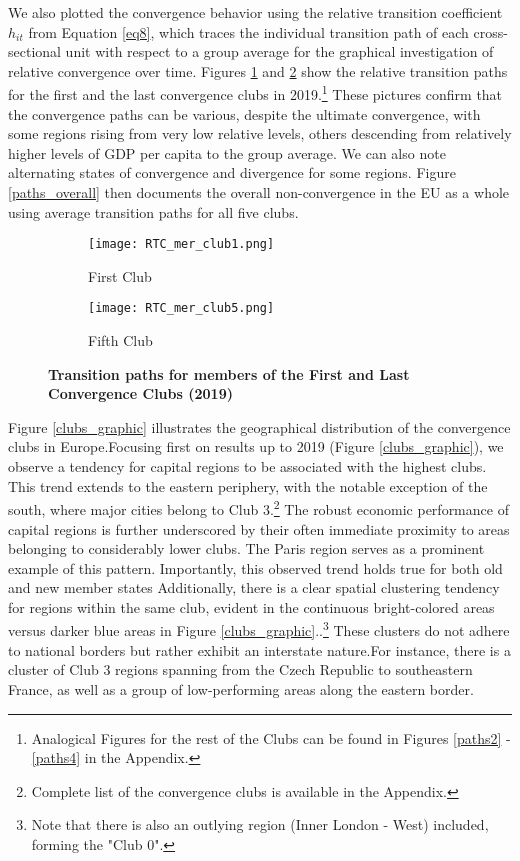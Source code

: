 \documentclass[11pt]{article}
\begin{document}
We also plotted the convergence behavior using the relative transition coefficient $h_{it}$ from Equation \ref{eq8}, which traces the individual transition path of each cross-sectional unit with respect to a group average for the graphical investigation of relative convergence over time. Figures \ref{paths1} and \ref{paths5} show the relative transition paths for the first and the last convergence clubs in 2019.\footnote{Analogical Figures for the rest of the Clubs can be found in Figures \ref{paths2} - \ref{paths4} in the Appendix.} These pictures confirm that the convergence paths can be various, despite the ultimate convergence, with some regions rising from very low relative levels, others descending from relatively higher levels of GDP per capita to the group average. We can also note alternating states of convergence and divergence for some regions. Figure \ref{paths_overall} then documents the overall non-convergence in the EU as a whole using average transition paths for all five clubs.

\begin{figure}[!htbp]%
    \centering
\begin{subfigure}{0.45\textwidth}
    \centering
    \texttt{[image: RTC\_mer\_club1.png]}
    \caption{First Club}
    \label{paths1}   
\end{subfigure}\hfill
\begin{subfigure}{0.45\textwidth}
    \centering
    \texttt{[image: RTC\_mer\_club5.png]}
    \caption{Fifth Club}
    \label{paths5}
\end{subfigure}
\caption{\textbf{Transition paths for members of the First and Last Convergence Clubs (2019)}}
\label{convergence_paths}

\end{figure}


Figure \ref{clubs_graphic} illustrates the geographical distribution of the convergence clubs in Europe.Focusing first on results up to 2019 (Figure \ref{clubs_graphic}), we observe a tendency for capital regions to be associated with the highest clubs. This trend extends to the eastern periphery, with the notable exception of the south, where major cities belong to Club 3.\footnote{Complete list of the convergence clubs is available in the Appendix.} The robust economic performance of capital regions is further underscored by their often immediate proximity to areas belonging to considerably lower clubs. The Paris region serves as a prominent example of this pattern. Importantly, this observed trend holds true for both old and new member states Additionally, there is a clear spatial clustering tendency for regions within the same club, evident in the continuous bright-colored areas versus darker blue areas in Figure \ref{clubs_graphic}..\footnote{Note that there is also an outlying region (Inner London - West) included, forming the "Club 0".} These clusters do not adhere to national borders but rather exhibit an interstate nature.For instance, there is a cluster of Club 3 regions spanning from the Czech Republic to southeastern France, as well as a group of low-performing areas along the eastern border.
\end{document}
